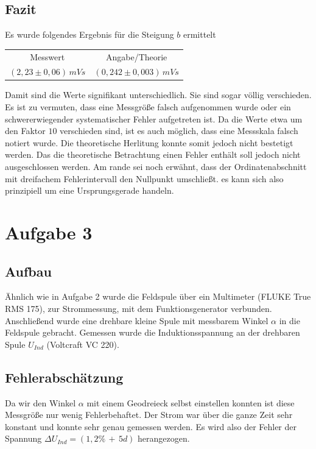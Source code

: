 \documentclass{article}
\begin{document}
\subsection{Fazit}
Es wurde folgendes Ergebnis für die Steigung \(b\) ermittelt
\begin{center}
\begin{tabular}{c c} 
 Messwert & Angabe/Theorie \\
 \( (2,23 \pm 0,06)\, mVs \) & \( (0,242 \pm 0,003)\, mVs \) \\
 \end{tabular}
\end{center}
Damit sind die Werte signifikant unterschiedlich. Sie sind sogar völlig verschieden. Es ist zu vermuten, dass eine Messgröße falsch aufgenommen wurde oder ein schwererwiegender systematischer Fehler aufgetreten ist. Da die Werte etwa um den Faktor \(10\) verschieden sind, ist es auch möglich, dass eine Messskala falsch notiert wurde. Die theoretische Herlitung konnte somit jedoch nicht bestetigt werden. Das die theoretische Betrachtung einen Fehler enthält soll jedoch nicht ausgeschlossen werden. Am rande sei noch erwähnt, dass der Ordinatenabschnitt mit dreifachem Fehlerintervall den Nullpunkt umschließt. es kann sich also prinzipiell um eine Ursprungsgerade handeln.

\section{Aufgabe 3}
\subsection{Aufbau}
Ähnlich wie in Aufgabe 2 wurde die Feldspule über ein Multimeter (FLUKE True RMS 175), zur Strommessung, mit dem Funktionsgenerator verbunden. Anschließend wurde eine drehbare kleine Spule mit messbarem Winkel \( \alpha \) in die Feldspule gebracht. Gemessen wurde die Induktionsspannung an der drehbaren Spule \( U_{Ind} \) (Voltcraft VC 220).
\subsection{Fehlerabschätzung}
Da wir den Winkel \( \alpha \) mit einem Geodreieck selbst einstellen konnten ist diese Messgröße nur wenig Fehlerbehaftet. Der Strom war über die ganze Zeit sehr konstant und konnte sehr genau gemessen werden. Es wird also der Fehler der Spannung \( \Delta U_{Ind} = (1,2\% \, + \, 5d ) \) herangezogen.
\end{document}
